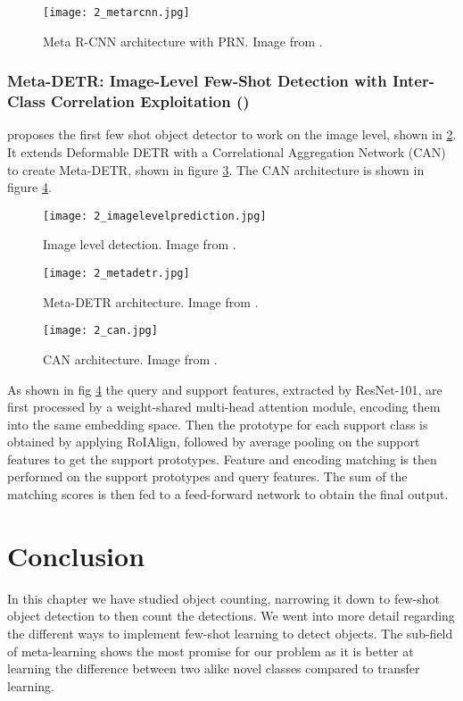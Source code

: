 \begin{figure}[h]
	\centering
	\texttt{[image: 2\_metarcnn.jpg]}
	\caption{\label{fig:2_metarcnn} Meta R-CNN architecture with PRN. Image from \citet{meta-rcnn}.}
\end{figure}

\subsubsection{Meta-DETR: Image-Level Few-Shot Detection with Inter-Class Correlation Exploitation (\citet{MetaDETR})}
\citet{MetaDETR} proposes the first few shot object detector to work on the image level, shown in \ref{fig:2_imagelevelprediction}. It extends Deformable DETR with a Correlational Aggregation Network (CAN) to create Meta-DETR, shown in figure \ref{fig:2_metadetr}. The CAN architecture is shown in figure \ref{fig:2_CAN}. 

\begin{figure}[h]
    \centering
    \texttt{[image: 2\_imagelevelprediction.jpg]}
    \caption{\label{fig:2_imagelevelprediction} Image level detection. Image from \citet{MetaDETR}.}
\end{figure}

\begin{figure}[h]
    \centering
    \texttt{[image: 2\_metadetr.jpg]}
    \caption{\label{fig:2_metadetr} Meta-DETR architecture. Image from \citet{MetaDETR}.}
\end{figure}

\begin{figure}[h]
    \centering
    \texttt{[image: 2\_can.jpg]}
    \caption{\label{fig:2_CAN} CAN architecture. Image from \citet{MetaDETR}.}
\end{figure}

As shown in fig \ref{fig:2_CAN} the query and support features, extracted by ResNet-101, are first processed by a weight-shared multi-head attention module, encoding them into the same embedding space. Then the prototype for each support class is obtained by applying RoIAlign, followed by average pooling on the support features to get the support prototypes. Feature and encoding matching is then performed on the support prototypes and query features. The sum of the matching scores is then fed to a feed-forward network to obtain the final output.

\section{Conclusion}
In this chapter we have studied object counting, narrowing it down to few-shot object detection to then count the detections. We went into more detail regarding the different ways to implement few-shot learning to detect objects. The sub-field of meta-learning shows the most promise for our problem as it is better at learning the difference between two alike novel classes compared to transfer learning.